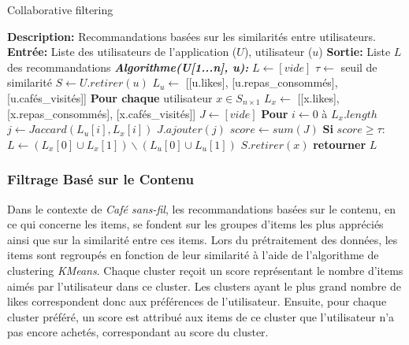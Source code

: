 \documentclass[11pt]{article}
\begin{document}
\begin{algorithm}
    \caption{Collaborative filtering}
    \begin{algorithmic}[1]
        \Statex \textbf{Description:} Recommandations basées sur les similarités entre utilisateurs.
        \Statex \textbf{Entrée:} Liste des utilisateurs de l'application ($U$), utilisateur ($u$)
        \Statex \textbf{Sortie:} Liste $L$ des recommandations
        \State \textbf{\textit{Algorithme(U[1...n], u):}}
        \State \hspace{0.5cm} $L \leftarrow [vide]$
        \State \hspace{0.5cm} $\tau \leftarrow$ seuil de similarité 
        \State \hspace{0.5cm} $S \leftarrow U.retirer(u)$
        \State \hspace{0.5cm} $L_u \leftarrow$ [[u.likes], [u.repas\_consommés], [u.cafés\_visités]]
        \State \hspace{0.5cm} \textbf{Pour chaque} utilisateur $x\in S_{n\times 1}$
        \State \hspace{1cm} $L_x \leftarrow$ [[x.likes], [x.repas\_consommés], [x.cafés\_visités]]
        \State \hspace{1cm} $J \leftarrow [vide]$
        \State \hspace{1cm} \textbf{Pour} $i \leftarrow 0$ à $L_x.length$
        \State \hspace{1.5cm} $j \leftarrow Jaccard(L_u[i], L_x[i])$
        \State \hspace{1.5cm} $J.ajouter(j)$
        \State \hspace{1cm} $score \leftarrow sum(J)$
        \State \hspace{1cm} \textbf{Si} $score \geq \tau$:
        \State \hspace{1.5cm} $L \leftarrow (L_x[0] \cup L_x[1]) \backslash (L_u[0] \cup L_u[1])$
        \State \hspace{1cm} $S.retirer(x)$
        \State \hspace{0.5cm} \textbf{retourner} $L$
    \end{algorithmic}
\end{algorithm}

\subsubsection{Filtrage Basé sur le Contenu}
Dans le contexte de \textit{Café sans-fil}, les recommandations basées sur le contenu, en ce qui concerne les items, se fondent sur les groupes d'items les plus appréciés ainsi que sur la similarité entre ces items. Lors du prétraitement des données, les items sont regroupés en fonction de leur similarité à l'aide de l'algorithme de clustering \textit{KMeans}. Chaque cluster reçoit un score représentant le nombre d'items aimés par l'utilisateur dans ce cluster. Les clusters ayant le plus grand nombre de likes correspondent donc aux préférences de l'utilisateur. Ensuite, pour chaque cluster préféré, un score est attribué aux items de ce cluster que l'utilisateur n'a pas encore achetés, correspondant au score du cluster.\
\end{document}
